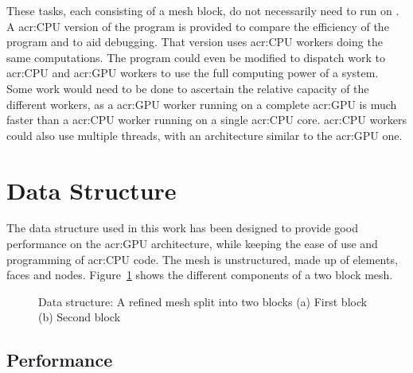 These tasks, each consisting of a mesh block, do not necessarily need to run on
. A \acrshort{acr:CPU} version of the program is provided to compare the
efficiency of the program and to aid debugging. That version uses \acrshort{acr:CPU} workers doing
the same computations. The program could even be modified to dispatch work to \acrshort{acr:CPU} and
\acrshort{acr:GPU} workers to use the full computing power of a system. Some work would need to be
done to ascertain the relative capacity of the different workers, as a \acrshort{acr:GPU} worker
running on a complete \acrshort{acr:GPU} is much faster than a \acrshort{acr:CPU} worker running on
a single \acrshort{acr:CPU} core. \Acrshort{acr:CPU} workers could also use multiple threads, with
an architecture similar to the \acrshort{acr:GPU} one.

\section{Data Structure}\label{section:graphics_processing_units:data_structure}

The data structure used in this work has been designed to provide good performance on the
\acrshort{acr:GPU} architecture, while keeping the ease of use and programming of \acrshort{acr:CPU}
code. The mesh is unstructured, made up of elements, faces and nodes.
Figure~\ref{fig:mesh_structure} shows the different components of a two block mesh.

\begin{figure}[H]
    \centering
    \hfill
    \caption{Data structure: A refined mesh split into two blocks (a) First block (b) Second block}\label{fig:mesh_structure}
\end{figure}

\subsection{Performance}\label{subsection:graphics_processing_units:data_structure:performance}

